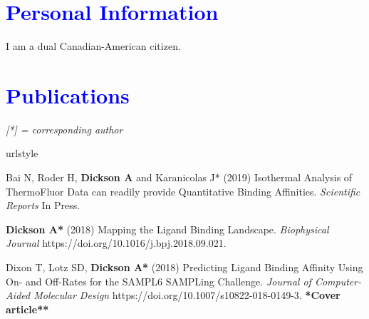 \documentclass[margin,line]{res}
\begin{document}
\begin{resume}
\section{\sc \textcolor{blue}{ Personal Information}}
I am a dual Canadian-American citizen.

\newpage
\section{\sc \textcolor{blue}{Publications}}


\emph{[*] = corresponding author}
\vspace {0.05in}

\begingroup
\begin{spacing}{1.2}
\renewcommand{\section}[2]{}%
\begin{thebibliography}{10}
\providecommand{\url}[1]{\texttt{#1}}
\providecommand{\urlprefix}{URL }
\expandafter\ifx\csname urlstyle\endcsname\relax
  \providecommand{\doi}[1]{doi:\discretionary{}{}{}#1}\else
  \providecommand{\doi}{doi:\discretionary{}{}{}\begingroup
  \urlstyle{rm}\Url}\fi
\providecommand{\bibAnnoteFile}[1]{%
  \IfFileExists{#1}{\begin{quotation}\noindent\textsc{Key:} #1\\
  \textsc{Annotation:}\ \end{quotation}}{}}
\providecommand{\bibAnnote}[2]{%
  \begin{quotation}\noindent\textsc{Key:} #1\\
  \textsc{Annotation:}\ #2\end{quotation}}
\providecommand{\eprint}[2][]{\url{#2}}

\setlength{\itemsep}{0.15in}

  Bai N, Roder H, {\bf Dickson A} and Karanicolas J* (2019) Isothermal Analysis of ThermoFluor Data can readily provide Quantitative Binding Affinities.
  \newblock \textit{Scientific Reports} In Press.

  {\bf Dickson A*} (2018) Mapping the Ligand Binding Landscape.
  \newblock \textit{Biophysical Journal} https://doi.org/10.1016/j.bpj.2018.09.021.

  Dixon T, Lotz SD, {\bf Dickson A*} (2018)
  Predicting Ligand Binding Affinity Using On- and Off-Rates for the SAMPL6 SAMPLing Challenge.
  \newblock \textit{Journal of Computer-Aided Molecular Design} https://doi.org/10.1007/s10822-018-0149-3. {\bf **Cover article**}


\end{thebibliography}
\end{spacing}
\end{resume}
\end{document}
